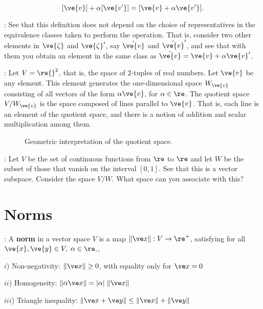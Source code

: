 \[ 
[\ve{v}] + \alpha [ \ve{v'} ] = [\ve{v} + \alpha \ve{v'}]. 
\]

\ejer: See that this definition does not depend on the choice of representatives in the equivalence classes taken to perform the operation. That is, consider two other elements in $\ve{\zeta}$ and $\ve{\zeta}'$, say $\hat{\ve{v}}$ and $\hat{\ve{v}}'$, and see that with them you obtain an element in the same class as $\tilde{\ve{v}} = \ve{v} + \alpha \ve{v}'$.

\ejem: Let $V = \re{}^2$, that is, the space of 2-tuples of real numbers. Let $\ve{v}$ be any element. This element generates the one-dimensional space $W_{\ve{v}}$ consisting of all vectors of the form $\alpha \ve{v}$, for $\alpha \in \re$. The quotient space $V/W_{\ve{v}}$ is the space composed of lines parallel to $\ve{v}$. That is, each line is an element of the quotient space, and there is a notion of addition and scalar multiplication among them.

\begin{figure}[htbp] \begin{center}  \caption{Geometric interpretation of the quotient space.} \label{fig:2_1} \end{center} \end{figure}

\ejer: Let $V$ be the set of continuous functions from $\re$ to $\re$ and let $W$ be the subset of those that vanish on the interval $[0,1]$. See that this is a vector subspace. Consider the space $V/W$. What space can you associate with this?


\section{Norms}


: A {\bf norm} in a vector space $V$ is a map $\|\ve x\|:V\to \re^+$, satisfying for all $\ve{x},\ve{y} \in V,\;\alpha\in \re,$,

$i$) Non-negativity: $\|\ve x\|\geq 0$, with equality only for $\ve x=0$

$ii$) Homogeneity: $\|\alpha \ve x\| =| \alpha|\;\|\ve x\|$

$iii$) Triangle inequality: $\|\ve x+\ve y\|\leq\|\ve x\|+\|\ve y\|$

